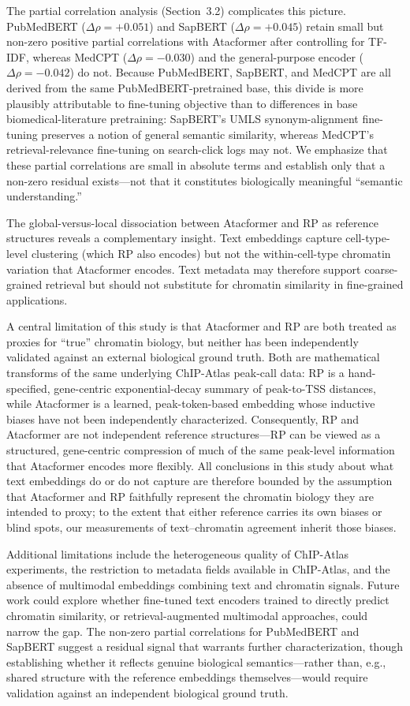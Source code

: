 \documentclass[conference]{IEEEtran}
\begin{document}
The partial correlation analysis (Section~3.2) complicates this picture.
PubMedBERT ($\Delta\rho = +0.051$) and SapBERT ($\Delta\rho = +0.045$) retain
small but non-zero positive partial correlations with Atacformer after
controlling for TF-IDF, whereas MedCPT ($\Delta\rho = -0.030$) and the
general-purpose encoder ($\Delta\rho = -0.042$) do not. Because PubMedBERT,
SapBERT, and MedCPT are all derived from the same PubMedBERT-pretrained base,
this divide is more plausibly attributable to fine-tuning objective than to
differences in base biomedical-literature pretraining: SapBERT's UMLS
synonym-alignment fine-tuning preserves a notion of general semantic
similarity, whereas MedCPT's retrieval-relevance fine-tuning on search-click
logs may not. We emphasize that these partial correlations are small in
absolute terms and establish only that a non-zero residual exists---not that
it constitutes biologically meaningful ``semantic understanding.''

The global-versus-local dissociation between Atacformer and RP as reference
structures reveals a complementary insight. Text embeddings capture cell-type-level
clustering (which RP also encodes) but not the within-cell-type chromatin
variation that Atacformer encodes. Text metadata may therefore support
coarse-grained retrieval but should not substitute for chromatin similarity in
fine-grained applications.

A central limitation of this study is that Atacformer and RP are both treated
as proxies for ``true'' chromatin biology, but neither has been independently
validated against an external biological ground truth. Both are mathematical
transforms of the same underlying ChIP-Atlas peak-call data: RP is a
hand-specified, gene-centric exponential-decay summary of peak-to-TSS
distances, while Atacformer is a learned, peak-token-based embedding whose
inductive biases have not been independently characterized. Consequently, RP
and Atacformer are not independent reference structures---RP can be viewed as
a structured, gene-centric compression of much of the same peak-level
information that Atacformer encodes more flexibly. All conclusions in this
study about what text embeddings do or do not capture are therefore bounded by
the assumption that Atacformer and RP faithfully represent the chromatin
biology they are intended to proxy; to the extent that either reference
carries its own biases or blind spots, our measurements of text--chromatin
agreement inherit those biases.

Additional limitations include the heterogeneous quality of ChIP-Atlas
experiments, the restriction to metadata fields available in ChIP-Atlas, and
the absence of multimodal embeddings combining text and chromatin signals.
Future work could explore whether fine-tuned text encoders trained to directly
predict chromatin similarity, or retrieval-augmented multimodal approaches,
could narrow the gap. The non-zero partial correlations for PubMedBERT and
SapBERT suggest a residual signal that warrants further characterization,
though establishing whether it reflects genuine biological semantics---rather
than, e.g., shared structure with the reference embeddings themselves---would
require validation against an independent biological ground truth.
\end{document}
